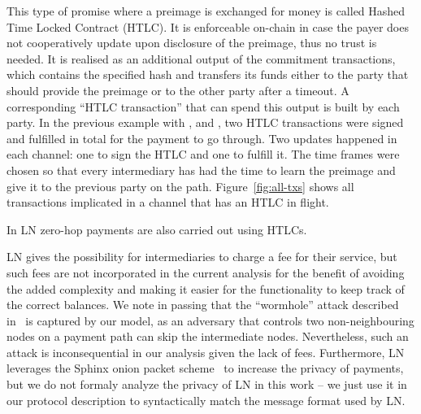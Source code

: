     This type of promise where a preimage is exchanged for money is called
    Hashed Time Locked Contract (HTLC). It is enforceable on-chain in case the
    payer does not cooperatively update upon disclosure of the preimage, thus no
    trust is needed. It is realised as an additional output of the
    commitment transactions, which contains the specified hash and transfers its
    funds either to the party that should provide the preimage or to the other
    party after a timeout. A corresponding ``HTLC transaction'' that can spend
    this output is built by each party. In the previous example with \alice{},
    \bob{} and \charlie, two HTLC transactions were signed and
    fulfilled in total for the payment to go through. Two updates
    happened in each channel: one to sign the HTLC and one to fulfill it. The
    time frames were chosen so that every intermediary has had the time to learn
    the preimage and give it to the previous party on the path.
    Figure~\ref{fig:all-txs} shows all transactions implicated in a
    channel that has an HTLC in flight.

    In LN zero-hop payments are also carried out using HTLCs.

    LN gives the possibility for intermediaries to charge a fee for their
    service, but such fees are not incorporated in the current analysis
    for the benefit of avoiding the added complexity and making it
    easier for the functionality to keep track of the correct balances. We note
    in passing that the ``wormhole'' attack described
    in~\cite{DBLP:conf/ndss/MalavoltaMSKM19} is captured by our model, as an
    adversary that controls two non-neighbouring nodes on a payment path can
    skip the intermediate nodes. Nevertheless, such an attack is inconsequential
    in our analysis given the lack of fees. Furthermore, LN leverages the
    Sphinx onion packet scheme~\cite{sphinx} to increase the privacy of
    payments, but we do not formaly analyze the privacy of LN in this work -- we
    just use it in our protocol description to syntactically match the message
    format used by LN.
